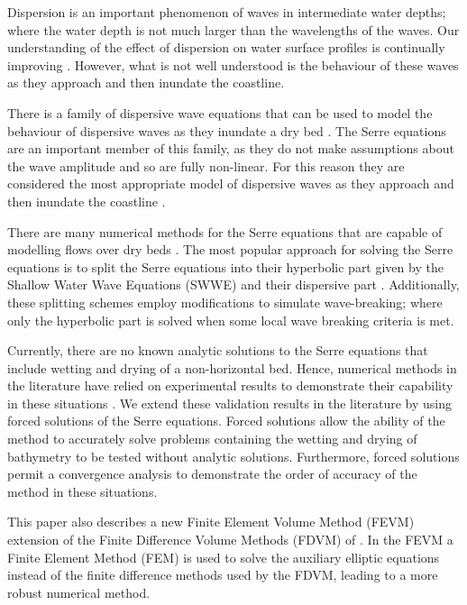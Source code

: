 \documentclass[times]{elsarticle}
\begin{document}
Dispersion is an important phenomenon of waves in intermediate water depths; where the water depth is not much larger than the wavelengths of the waves. Our understanding of the effect of dispersion on water surface profiles is continually improving \cite{Pitt-2018-61}. However, what is not well understood is the behaviour of these waves as they approach and then inundate the coastline. 

There is a family of dispersive wave equations that can be used to model the behaviour of dispersive waves as they inundate a dry bed \cite{Bonneton-Lannes-2009-16601}. The Serre equations \cite{Serre-F-1953-857} are an important member of this family, as they do not make assumptions about the wave amplitude and so are fully non-linear. For this reason they are considered the most appropriate model of dispersive waves as they approach and then inundate the coastline \cite{Bonneton-Lannes-2009-16601}.

There are many numerical methods for the Serre equations that are capable of modelling flows over dry beds \cite{Tissier-2011,Li-2014-169,Filippini-etal-2016-381,DoCarmo-2019-125}. The most popular approach for solving the Serre equations is to split the Serre equations into their hyperbolic part given by the Shallow Water Wave Equations (SWWE) and their dispersive part \cite{Tissier-2011,Filippini-etal-2016-381,DoCarmo-2019-125}. Additionally, these splitting schemes employ modifications to simulate wave-breaking; where only the hyperbolic part is solved when some local wave breaking criteria is met. 

Currently, there are no known analytic solutions to the Serre equations that include wetting and drying of a non-horizontal bed. Hence, numerical methods in the literature have relied on experimental results to demonstrate their capability in these situations \cite{Tissier-2011,Li-2014-169,Filippini-etal-2016-381,DoCarmo-2019-125}. We extend these validation results in the literature by using forced solutions of the Serre equations. Forced solutions allow the ability of the method to accurately solve problems containing the wetting and drying of bathymetry to be tested without analytic solutions. Furthermore, forced solutions permit a convergence analysis to demonstrate the order of accuracy of the method in these situations. 

This paper also describes a new Finite Element Volume Method (FEVM) extension of the Finite Difference Volume Methods (FDVM) of \citet{Zoppou-etal-2017}. In the FEVM a Finite Element Method (FEM) is used to solve the auxiliary elliptic equations instead of the finite difference methods used by the FDVM, leading to a more robust numerical method.
\end{document}
